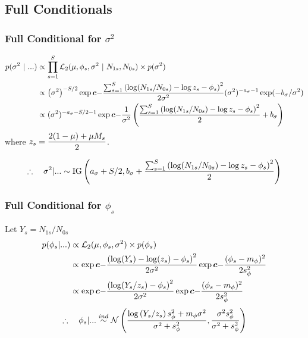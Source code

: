 \documentclass[12pt]{article}
\newcommand{\bc}{\mbox{\boldmath $c$}}
\begin{document}
\subsection{Full Conditionals}

\subsubsection{Full Conditional for $\sigma^2$}
\begin{align*}
p(\sigma^2 ~|~ ...) &\propto \prod_{s=1}^S \mathcal{L}_2(\mu,\phi_s,\sigma^2 ~|~ N_{1s}, N_{0s}) \times p(\sigma^2)\\
                    &\propto \p{\sigma^2}^{-S/2}\exp\bc{\ds-\frac{\sums\p{\log(N_{1s}/N_{0s})-\log z_s-\phi_s}^2}{2\sigma^2}} (\sigma^2)^{-a_\sigma-1} \exp(-b_\sigma/\sigma^2)\\
                    &\propto (\sigma^2)^{-a_\sigma-S/2-1} \exp\bc{-\frac{1}{\sigma^2}\p{\frac{\sums\p{\log(N_{1s}/N_{0s})-\log z_s-\phi_s}^2}{2}+b_\sigma}}\\
\end{align*}
where $z_s = \displaystyle\frac{2(1-\mu)+\mu M_s}{2}$.

$$
\therefore ~~~ \sigma^2|... \sim \text{IG}\left(a_\sigma+S/2, b_\sigma+\frac{\sum_{s=1}^S\left(\log(N_{1s}/N_{0s})-\log z_s-\phi_s\right)^2}{2}\right)
$$

\subsubsection{Full Conditional for $\phi_s$}
Let $Y_s = N_{1s}/N_{0s}$
\begin{align*}
  p(\phi_s|...) &\propto\L_2(\mu,\phi_s,\sigma^2) \times p(\phi_s)\\
                &\propto\exp\bc{-\frac{\p{\log(Y_s)-\log(z_s)-\phi_s}^2}{2\sigma^2}}
  \exp\bc{-\frac{(\phi_s-m_\phi)^2}{2s_\phi^2}}\\
                &\propto\exp\bc{-\frac{\p{\log(Y_s/z_s)-\phi_s}^2}{2\sigma^2}} 
  \exp\bc{-\frac{(\phi_s-m_\phi)^2}{2s_\phi^2}}\\
\end{align*}
$$
\therefore ~~~ \phi_s | ... \overset{ind}{\sim}  \mathcal N\left(\frac{\log\left(Y_s/z_s\right)s_\phi^2+m_\phi\sigma^2}{\sigma^2+s_\phi^2},\frac{\sigma^2 s_\phi^2}{\sigma^2+s_\phi^2}\right)
$$
\end{document}
